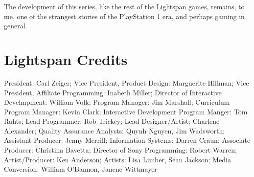 The development of this series, like the rest of the Lightspan games, remains, to me, one of the strangest stories of the PlayStation 1 era, and perhaps gaming in general.

\section{Lightspan Credits}
President: Carl Zeiger;
Vice President, Product Design: Marguerite Hillman;
Vice President, Affiliate Programming: Inabeth Miller;
Director of Interactive Develmpment: William Volk;
Program Manager: Jim Marshall;
Curriculum Program Manager: Kevin Clark;
Interactive Development Program Manger: Tom Rahts;
Lead Programmer: Rob Trickey;
Lead Designer/Artist: Charlene Alexander;
Quality Assurance Analysts: Quynh Nguyen, Jim Wadsworth;
Assistant Producer: Jenny Merrill;
Information Systems: Darren Craun;
Associate Producer: Christina Bavetta;
Director of Sony Programming: Robert Warren;
Artist/Producer: Ken Anderson;
Artists: Lisa Limber, Sean Jackson;
Media Conversion: William O'Bannon, Janene Wittmayer